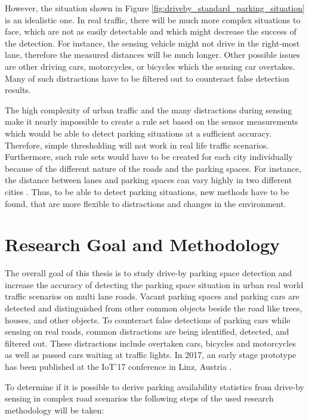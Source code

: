 However, the situation shown in Figure \ref{fig:driveby_standard_parking_situation} is an idealistic one. In real traffic, there will be much more complex situations to face, which are not as easily detectable and which might decrease the success of the detection. For instance, the sensing vehicle might not drive in the right-most lane, therefore the measured distances will be much longer. Other possible issues are other driving cars, motorcycles, or bicycles which the sensing car overtakes. Many of such distractions have to be filtered out to counteract false detection results.

The high complexity of urban traffic and the many distractions during sensing make it nearly impossible to create a rule set based on the sensor measurements which would be able to detect parking situations at a sufficient accuracy. Therefore, simple thresholding will not work in real life traffic scenarios. Furthermore, such rule sets would have to be created for each city individually because of the different nature of the roads and the parking spaces. For instance, the distance between lanes and parking spaces can vary highly in two different cities \cite{Grassi:2017:PIE:3132211.3134452}. Thus, to be able to detect parking situations, new methods have to be found, that are more flexible to distractions and changes in the environment.




\section{Research Goal and Methodology}

The overall goal of this thesis is to study drive-by parking space detection and increase the accuracy of detecting the parking space situation in urban real world traffic scenarios on multi lane roads. Vacant parking spaces and parking cars are detected and distinguished from other common objects beside the road like trees, houses, and other objects. To counteract false detections of parking cars while sensing on real roads, common distractions are being identified, detected, and filtered out. These distractions include overtaken cars, bicycles and motorcycles as well as passed cars waiting at traffic lights. 
In 2017, an early stage prototype has been published at the IoT'17 conference in Linz, Austria \cite{Hiesmair2017}.

To determine if it is possible to derive parking availability statistics from drive-by sensing in complex road scenarios the following steps of the used research methodology will be taken:


